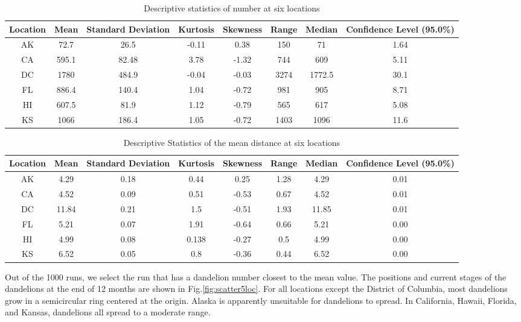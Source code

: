 \documentclass[12pt]{article}
\begin{document}
			{
				\fontsize{10}{14}\selectfont
				{
					\begin{longtable}{cccccccc}
						\caption{Descriptive statistics of number at six locations}
						\label{tb:numDistribution}\\
						\toprule
						Location&Mean&Standard Deviation&Kurtosis&Skewness&Range&Median&Confidence Level (95.0\%)\\
						\toprule
						AK&72.7&26.5&-0.11&0.38&150&71&1.64\\
						CA&595.1&82.48&3.78&-1.32&744&609&5.11\\
						DC&1780&484.9&-0.04&-0.03&3274&1772.5&30.1\\
						FL&886.4&140.4&1.04&-0.72&981&905&8.71\\
						HI&607.5&81.9&1.12&-0.79&565&617&5.08\\
						KS&1066&186.4&1.05&-0.72&1403&1096&11.6\\
						\bottomrule
					\end{longtable}
					
				}
			}
			
			{
				\fontsize{10}{14}\selectfont
				{
					\begin{longtable}{cccccccc}
						\caption{Descriptive Statistics of the mean distance at six locations}
						\label{tb:distDistribution}\\
						\toprule
						Location&Mean&Standard Deviation&Kurtosis&Skewness&Range&Median&Confidence Level (95.0\%)\\
						\toprule
						AK&4.29&0.18&0.44&0.25&1.28&4.29&0.01\\
						CA&4.52&0.09&0.51&-0.53&0.67&4.52&0.01\\
						DC&11.84&0.21&1.5&-0.51&1.93&11.85&0.01\\
						FL&5.21&0.07&1.91&-0.64&0.66&5.21&0.00\\
						HI&4.99&0.08&0.138&-0.27&0.5&4.99&0.00\\
						KS&6.52&0.05&0.8&-0.36&0.44&6.52&0.00\\
						\bottomrule
					\end{longtable}
				}
			}
			
			Out of the 1000 runs, we select the run that has a dandelion number closest to the mean value.  The positions and current stages of the dandelions at the end of 12 months are shown in Fig.\ref{fig:scatter5loc}.  For all locations except the District of Columbia, most dandelions grow in a semicircular ring centered at the origin.  Alaska is apparently unsuitable for dandelions to spread.  In California, Hawaii, Florida, and Kansas, dandelions all spread to a moderate range.
			
\end{document}
